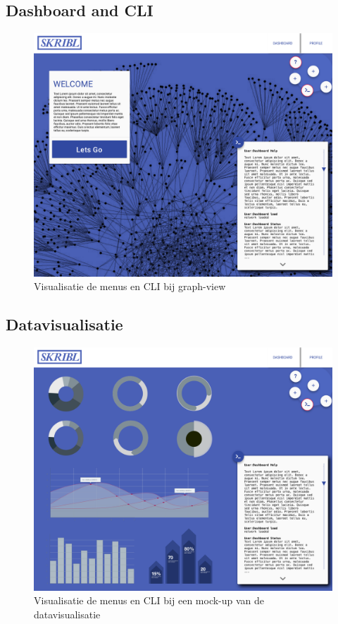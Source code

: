 \documentclass{article}
\begin{document}
\begin{appendices}
\clearpage
\subsection{Dashboard and CLI}
\begin{figure}[!h]
\centering
 \includegraphics[width=140mm]{pieteruploads/SKRBL_FRNT_HomeGraph.png}
 \caption{Visualisatie de menus en CLI bij graph-view}
\end{figure}

\clearpage

\subsection{Datavisualisatie}
\begin{figure}[!h]
\centering
 \includegraphics[width=140mm]{pieteruploads/SKRBL_FRNT_Dataviz.png}
 \caption{Visualisatie de menus en CLI bij een mock-up van de datavisualisatie}
\end{figure}

\clearpage
\end{appendices}
\end{document}
